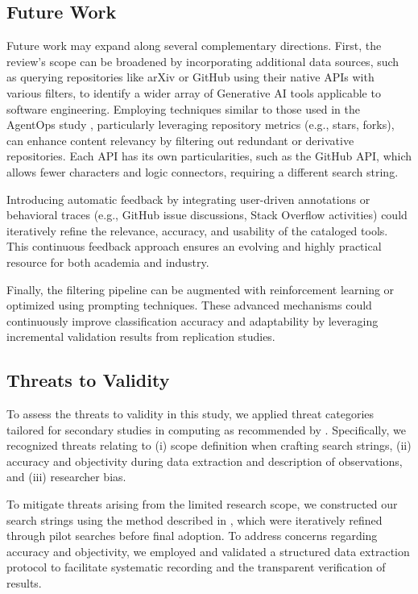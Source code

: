 \subsection{Future Work}

Future work may expand along several complementary directions. First, the review's scope can be broadened by incorporating additional data sources, such as querying repositories like arXiv or GitHub using their native APIs with various filters, to identify a wider array of Generative AI tools applicable to software engineering. Employing techniques similar to those used in the AgentOps study \cite{dong2024taxonomy}, particularly leveraging repository metrics (e.g., stars, forks), can enhance content relevancy by filtering out redundant or derivative repositories. Each API has its own particularities, such as the GitHub API, which allows fewer characters and logic connectors, requiring a different search string.

Introducing automatic feedback by integrating user-driven annotations or behavioral traces (e.g., GitHub issue discussions, Stack Overflow activities) could iteratively refine the relevance, accuracy, and usability of the cataloged tools. This continuous feedback approach ensures an evolving and highly practical resource for both academia and industry.

Finally, the filtering pipeline can be augmented with reinforcement learning or optimized using prompting techniques. These advanced mechanisms could continuously improve classification accuracy and adaptability by leveraging incremental validation results from replication studies.


\subsection{Threats to Validity}

To assess the threats to validity in this study, we applied threat categories tailored for secondary studies in computing as recommended by \cite{ampatzoglou2019identifying}. Specifically, we recognized threats relating to (i) scope definition when crafting search strings, (ii) accuracy and objectivity during data extraction and description of observations, and (iii) researcher bias.

To mitigate threats arising from the limited research scope, we constructed our search strings using the method described in \cite{garousi2020grey}, which were iteratively refined through pilot searches before final adoption. To address concerns regarding accuracy and objectivity, we employed and validated a structured data extraction protocol to facilitate systematic recording and the transparent verification of results.


